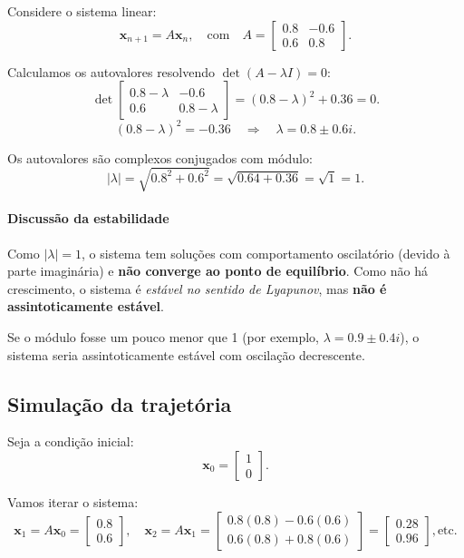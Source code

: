 \documentclass{article}
\begin{document}
Considere o sistema linear:
\begin{equation}
\bm{x}_{n+1} = A \bm{x}_n, \quad \text{com} \quad 
A = \begin{bmatrix}
0.8 & -0.6 \\
0.6 & 0.8
\end{bmatrix}.
\end{equation}

Calculamos os autovalores resolvendo $\det(A - \lambda I) = 0$:
\[
\det\begin{bmatrix}
0.8 - \lambda & -0.6 \\
0.6 & 0.8 - \lambda
\end{bmatrix}
= (0.8 - \lambda)^2 + 0.36 = 0.
\]
\[
(0.8 - \lambda)^2 = -0.36 \quad \Rightarrow \quad \lambda = 0.8 \pm 0.6i.
\]

Os autovalores são complexos conjugados com módulo:
\[
|\lambda| = \sqrt{0.8^2 + 0.6^2} = \sqrt{0.64 + 0.36} = \sqrt{1} = 1.
\]

\paragraph{Discussão da estabilidade}
Como $|\lambda| = 1$, o sistema tem soluções com comportamento
oscilatório (devido à parte imaginária) e \textbf{não converge ao ponto
  de equilíbrio}. Como não há crescimento, o sistema é \emph{estável no
  sentido de Lyapunov}, mas \textbf{não é assintoticamente estável}.

Se o módulo fosse um pouco menor que 1 (por exemplo,
$\lambda = 0.9 \pm 0.4i$), o sistema seria {assintoticamente estável
  com oscilação decrescente}.

\subsection*{Simulação da trajetória}

Seja a condição inicial:
\[
\bm{x}_0 = \begin{bmatrix} 1 \\ 0 \end{bmatrix}.
\]

Vamos iterar o sistema:
\[
\bm{x}_1 = A \bm{x}_0 = \begin{bmatrix} 0.8 \\ 0.6 \end{bmatrix}, \quad
\bm{x}_2 = A \bm{x}_1 = \begin{bmatrix} 0.8(0.8) - 0.6(0.6) \\ 0.6(0.8) + 0.8(0.6) \end{bmatrix} = \begin{bmatrix} 0.28 \\ 0.96 \end{bmatrix}, \text{etc.}
\]
\end{document}
